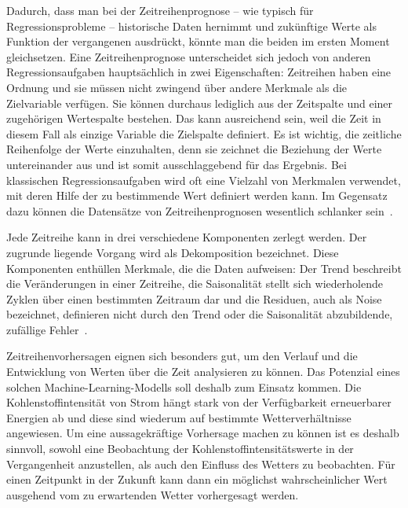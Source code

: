 Dadurch, dass man bei der Zeitreihenprognose -- wie typisch für Regressionsprobleme -- historische Daten hernimmt und zukünftige Werte als Funktion der vergangenen ausdrückt, könnte man die beiden im ersten Moment gleichsetzen.
Eine Zeitreihenprognose unterscheidet sich jedoch von anderen Regressionsaufgaben hauptsächlich in zwei Eigenschaften:
Zeitreihen haben eine Ordnung und sie müssen nicht zwingend über andere Merkmale als die Zielvariable verfügen.
Sie können durchaus lediglich aus der Zeitspalte und einer zugehörigen Wertespalte bestehen.
Das kann ausreichend sein, weil die Zeit in diesem Fall als einzige Variable die Zielspalte definiert.
Es ist wichtig, die zeitliche Reihenfolge der Werte einzuhalten, denn sie zeichnet die Beziehung der Werte untereinander aus und ist somit ausschlaggebend für das Ergebnis.
Bei klassischen Regressionsaufgaben wird oft eine Vielzahl von Merkmalen verwendet, mit deren Hilfe der zu bestimmende Wert definiert werden kann.
Im Gegensatz dazu können die Datensätze von Zeitreihenprognosen wesentlich schlanker sein~\cite{Peixeiro.2022}.

Jede Zeitreihe kann in drei verschiedene Komponenten zerlegt werden.
Der zugrunde liegende Vorgang wird als Dekomposition bezeichnet.
Diese Komponenten enthüllen Merkmale, die die Daten aufweisen:
Der Trend beschreibt die Veränderungen in einer Zeitreihe, die Saisonalität stellt sich wiederholende Zyklen über einen bestimmten Zeitraum dar und die Residuen, auch als Noise bezeichnet, definieren nicht durch den Trend oder die Saisonalität abzubildende, zufällige Fehler~\cite{Peixeiro.2022}.

Zeitreihenvorhersagen eignen sich besonders gut, um den Verlauf und die Entwicklung von Werten über die Zeit analysieren zu können.
Das Potenzial eines solchen Machine-Learning-Modells soll deshalb zum Einsatz kommen.
Die Kohlenstoffintensität von Strom hängt stark von der Verfügbarkeit erneuerbarer Energien ab und diese sind wiederum auf bestimmte Wetterverhältnisse angewiesen.
Um eine aussagekräftige Vorhersage machen zu können ist es deshalb sinnvoll, sowohl eine Beobachtung der Kohlenstoffintensitätswerte in der Vergangenheit anzustellen, als auch den Einfluss des Wetters zu beobachten.
Für einen Zeitpunkt in der Zukunft kann dann ein möglichst wahrscheinlicher Wert ausgehend vom zu erwartenden Wetter vorhergesagt werden.


